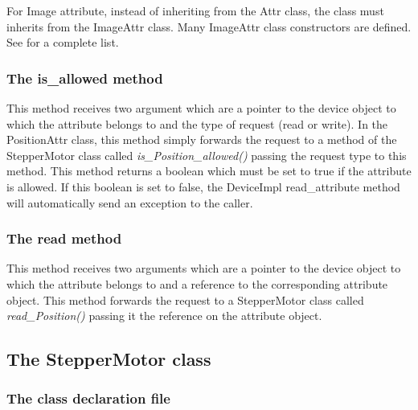 For Image attribute, instead of inheriting from the Attr class, the
class must inherits from the ImageAttr class. Many ImageAttr
class constructors are defined. See \cite{TANGO_ref_man}for a complete
list. 

\subsubsection{The is\_allowed method}

This method receives two argument which are a pointer to the device
object to which the attribute belongs to and the type of request (read
or write). In the PositionAttr class, this method simply \textquotedbl{}forwards\textquotedbl{}
the request to a method of the StepperMotor class called \emph{is\_Position\_allowed()}
passing the request type to this method. This method returns a boolean
which must be set to true if the attribute is allowed. If this boolean
is set to false, the DeviceImpl read\_attribute
method will automatically send an exception to the caller.

\subsubsection{The read method}

This method receives two arguments which are a pointer to the device
object to which the attribute belongs to and a reference to the corresponding
attribute object. This method \textquotedbl{}forwards\textquotedbl{}
the request to a StepperMotor class called \emph{read\_Position()}
passing it the reference on the attribute object.


\subsection{The StepperMotor class}

\subsubsection{The class declaration file}

